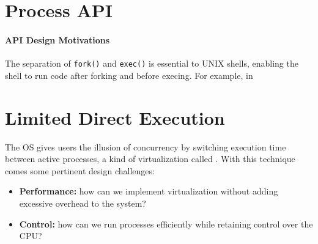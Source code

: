 
\section{Process API} \label{sec:processapi}


\paragraph{API Design Motivations}
The separation of \texttt{fork()} and \texttt{exec()} is essential to UNIX shells, enabling the shell to run code after forking and before execing. For example, in 


\section{Limited Direct Execution}
The OS gives users the illusion of concurrency by switching execution time between active processes, a kind of virtualization called . With this technique comes some pertinent design challenges:
\begin{itemize}
    \item \textbf{Performance:} how can we implement virtualization without adding excessive overhead to the system?
    \item \textbf{Control:} how can we run processes efficiently while retaining control over the CPU?
\end{itemize}

